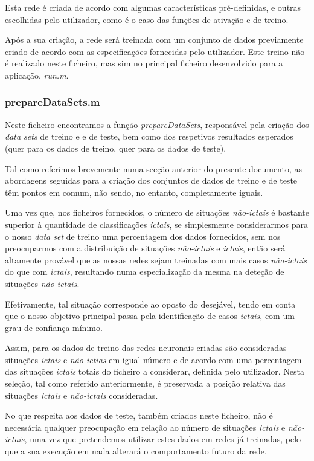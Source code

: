 \documentclass{article}
\begin{document}
Esta rede é criada de acordo com algumas características pré-definidas, e outras escolhidas pelo utilizador, como é o caso das funções de ativação e de treino.

Após a sua criação, a rede será treinada com um conjunto de dados previamente criado de acordo com as especificações fornecidas pelo utilizador. Este treino não é realizado neste ficheiro, mas sim no principal ficheiro desenvolvido para a aplicação, \emph{run.m}.

\subsubsection{prepareDataSets.m}

Neste ficheiro encontramos a função \emph{prepareDataSets}, responsável pela criação dos \emph{data sets} de treino e e de teste, bem como dos respetivos resultados esperados (quer para os dados de treino, quer para os dados de teste).

Tal como referimos brevemente numa secção anterior do presente documento, as abordagens seguidas para a criação dos conjuntos de dados de treino e de teste têm pontos em comum, não sendo, no entanto, completamente iguais.

Uma vez que, nos ficheiros fornecidos, o número de situações \emph{não-ictais} é bastante superior à quantidade de classificações \emph{ictais}, se simplesmente considerarmos para o nosso \emph{data set} de treino uma percentagem dos dados fornecidos, sem nos preocuparmos com a distribuição de situações \emph{não-ictais} e \emph{ictais}, então será altamente provável que as nossas redes sejam treinadas com mais casos \emph{não-ictais} do que com \emph{ictais}, resultando numa especialização da mesma na deteção de situações \emph{não-ictais}.

Efetivamente, tal situação corresponde ao oposto do desejável, tendo em conta que o nosso objetivo principal passa pela identificação de casos \emph{ictais}, com um grau de confiança mínimo.

Assim, para os dados de treino das redes neuronais criadas são consideradas situações \emph{ictais} e \emph{não-ictias} em igual número e de acordo com uma percentagem das situações \emph{ictais} totais do ficheiro a considerar, definida pelo utilizador. Nesta seleção, tal como referido anteriormente, é preservada a posição relativa das situações \emph{ictais} e \emph{não-ictais} consideradas.

No que respeita aos dados de teste, também criados neste ficheiro, não é necessária qualquer preocupação em relação ao número de situações \emph{ictais} e \emph{não-ictais}, uma vez que pretendemos utilizar estes dados em redes já treinadas, pelo que a sua execução em nada alterará o comportamento futuro da rede.
\end{document}
